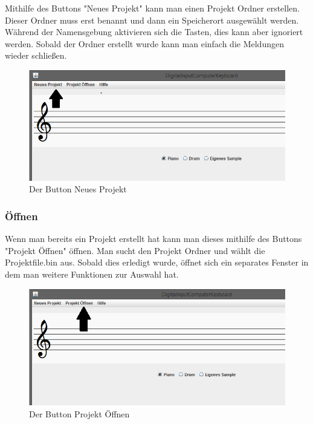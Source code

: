 Mithilfe des Buttons "Neues Projekt" kann man einen Projekt Ordner erstellen. Dieser Ordner muss erst benannt und dann ein Speicherort ausgewählt werden. Während der Namensgebung aktivieren sich die Tasten, dies kann aber ignoriert werden. Sobald der Ordner erstellt wurde kann man einfach die Meldungen wieder schließen.

\begin{figure}[hbtp]
\centering
\includegraphics[scale=0.6]{Bilder/Projektbild2_1.PNG}
\caption{Der Button Neues Projekt}
\end{figure}


\subsubsection{Öffnen}

Wenn man bereits ein Projekt erstellt hat kann man dieses mithilfe des Buttons "Projekt Öffnen" öffnen. Man sucht den Projekt Ordner und wählt die Projektfile.bin aus. Sobald dies erledigt wurde, öffnet sich ein separates Fenster in dem man weitere Funktionen zur Auswahl hat.

\begin{figure}[hbtp]
\centering
\includegraphics[scale=0.6]{Bilder/Projektbild3_1.PNG}
\caption{Der Button Projekt Öffnen}
\end{figure}

\newpage




